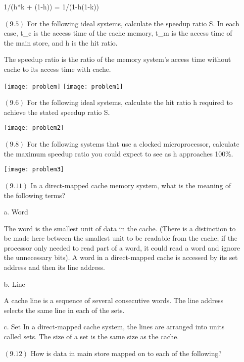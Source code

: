 \documentclass[letterpaper,10pt,titlepage]{article}
\begin{document}
\begin{enumerate}
1/(h*k + (1-h)) = 1/(1-h(1-k))


\item[$(9.5)$] For the following ideal systems, calculate the speedup ratio S. In each case, t\_c is the access time of
the cache memory, t\_m is the access time of the main store, and h is the hit ratio. 

The speedup ratio is the ratio of the memory system’s access time without cache to its access time with cache.

\begin{center}
\texttt{[image: problem]}
\texttt{[image: problem1]}
\end{center}


\item[$(9.6)$] For the following ideal systems, calculate the hit ratio h required to achieve the stated speedup ratio S.

\begin{center}
\texttt{[image: problem2]}
\end{center}


\item[$(9.8)$] For the following systems that use a clocked microprocessor, calculate the maximum speedup ratio you could expect to see as h approaches 100\%.

\begin{center}
\texttt{[image: problem3]}
\end{center}


\item[$(9.11)$] In a direct-mapped cache memory system, what is the meaning of the following terms?

a. Word 

The word is the smallest unit of data in the cache. (There is a distinction to be made here between the smallest unit to be readable from the cache; if the processor only needed to read part of a word, it could read a word and ignore the unnecessary bits). A word in a direct-mapped cache is accessed by its set address and then its line address. 

b. Line

A cache line is a sequence of several consecutive words. The line address selects the same line in each of the sets. 

c. Set
In a direct-mapped cache system, the lines are arranged into units called sets. The size of a set is the same size as the cache. 


\item[$(9.12)$] How is data in main store mapped on to each of the following? 


\end{enumerate}
\end{document}
